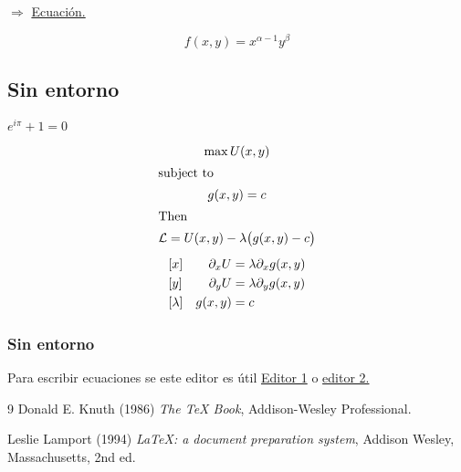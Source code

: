 \documentclass[12pt]{article}
\begin{document}
$\Longrightarrow$ \underline{Ecuación.} \cite{texbook}

\begin{equation} %
f(x,y)=x^{\alpha-1}y^{\beta}
\label{eq:Cobb-douglas} %
\end{equation}

\subsection{Sin entorno}

$e^{i\pi} + 1 = 0$

\begin{gather*}
\max U(x,y)\\
\shortintertext{subject to}
g(x,y) = c\\
\shortintertext{Then}
\mathcal{L} = U(x,y) - \lambda \bigl(g(x,y) -c\bigr) \\[1ex]
\begin{alignedat}{2}
&[x] &       \partial_x U &= \lambda \partial_x g(x,y)\\
&[y] &       \partial_y U &= \lambda \partial_y g(x,y)\\
&[\lambda] & \quad g(x,y) &= c
\end{alignedat}
\end{gather*}


\subsubsection{Sin entorno}

Para escribir ecuaciones se este editor es útil \href{https://editor.codecogs.com/}{Editor 1} o \href{https://latex.codecogs.com/eqneditor/editor.php}{editor 2.}



\begin{thebibliography}{9}
Donald E. Knuth (1986) \emph{The \TeX{} Book}, Addison-Wesley Professional.

Leslie Lamport (1994) \emph{\LaTeX: a document preparation system}, Addison
Wesley, Massachusetts, 2nd ed.
\end{thebibliography}
\end{document}
